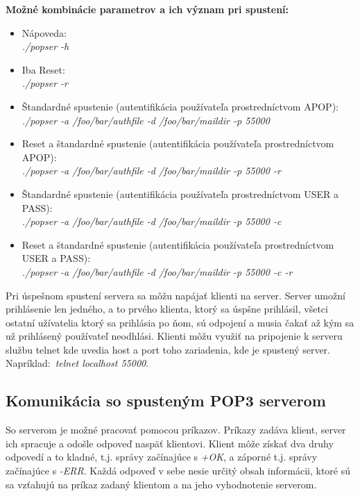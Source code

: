 \documentclass[11pt,a4paper]{article}
\begin{document}
	\textbf{Možné kombinácie parametrov a ich význam pri spustení:}
	\begin{itemize}

		\item Nápoveda:\\[0.1em]
		\textit{./popser -h}

		\item Iba Reset:\\[0.1em]
		\textit{./popser -r}

		\item Štandardné spustenie (autentifikácia používateľa prostredníctvom APOP):\\[0.1em]
		\textit{./popser -a /foo/bar/authfile -d /foo/bar/maildir -p 55000}

		\item Reset a štandardné spustenie (autentifikácia používateľa prostredníctvom APOP):\\[0.1em]
		\textit{./popser -a /foo/bar/authfile -d /foo/bar/maildir -p 55000 -r}

		\item Štandardné spustenie (autentifikácia používateľa prostredníctvom USER a PASS):\\[0.1em]
		\textit{./popser -a /foo/bar/authfile -d /foo/bar/maildir -p 55000 -c}

		\item Reset a štandardné spustenie (autentifikácia používateľa prostredníctvom USER a PASS):\\[0.1em]
		\textit{./popser -a /foo/bar/authfile -d /foo/bar/maildir -p 55000 -c -r }

	\end{itemize}

	\indent Pri úspešnom spustení servera sa môžu napájať klienti na server. Server umožní prihlásenie len jedného, a to prvého klienta, ktorý sa úspšne prihlásil, všetci ostatní užívatelia ktorý sa prihlásia po ňom, sú odpojení a musia čakať až kým sa už prihlásený používateľ neodhlási. Klienti môžu využiť na pripojenie k serveru službu telnet kde uvedia host a port toho zariadenia, kde je spustený server. Napríklad: \textit{telnet localhost 55000}.

	\subsection{Komunikácia so spusteným POP3 serverom}

	So serverom je možné pracovať pomocou príkazov. Príkazy zadáva klient, server ich spracuje a odošle odpoveď naspäť klientovi. Klient môže získať dva druhy odpovedí a to kladné, t.j. správy začínajúce s \textit{+OK}, a záporné t.j. správy začínajúce s \textit{-ERR}. Každá odpoveď v sebe nesie určitý obsah informácii, ktoré sú sa vzťahujú na príkaz zadaný klientom a na jeho vyhodnotenie serverom.\\[0.4em]
\end{document}

